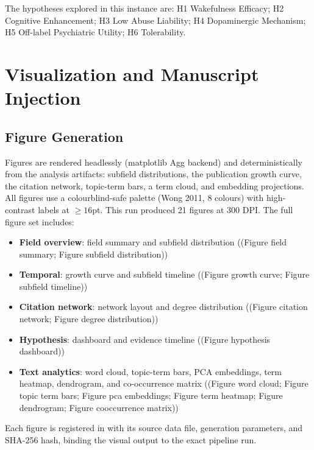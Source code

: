 \documentclass[
  english,
]{article}
\providecommand{\tightlist}{%
  \setlength{\itemsep}{0pt}\setlength{\parskip}{0pt}}
\begin{document}
The hypotheses explored in this instance are: H1 Wakefulness Efficacy;
H2 Cognitive Enhancement; H3 Low Abuse Liability; H4 Dopaminergic
Mechanism; H5 Off-label Psychiatric Utility; H6 Tolerability.

\newpage

\section{Visualization and Manuscript
Injection}\label{visualization-and-manuscript-injection}

\subsection{Figure Generation}\label{figure-generation}

Figures are rendered headlessly (matplotlib Agg backend) and
deterministically from the analysis artifacts: subfield distributions,
the publication growth curve, the citation network, topic-term bars, a
term cloud, and embedding projections. All figures use a
colourblind-safe palette (Wong 2011, 8 colours) with high-contrast
labels at \(\geq 16\)pt. This run produced 21 figures at 300 DPI. The
full figure set includes:

\begin{itemize}
\tightlist
\item
  \textbf{Field overview}: field summary and subfield distribution
  ((Figure field summary; Figure subfield distribution))
\item
  \textbf{Temporal}: growth curve and subfield timeline ((Figure growth
  curve; Figure subfield timeline))
\item
  \textbf{Citation network}: network layout and degree distribution
  ((Figure citation network; Figure degree distribution))
\item
  \textbf{Hypothesis}: dashboard and evidence timeline ((Figure
  hypothesis dashboard))
\item
  \textbf{Text analytics}: word cloud, topic-term bars, PCA embeddings,
  term heatmap, dendrogram, and co-occurrence matrix ((Figure word
  cloud; Figure topic term bars; Figure pca embeddings; Figure term
  heatmap; Figure dendrogram; Figure cooccurrence matrix))
\end{itemize}

Each figure is registered in  with its
source data file, generation parameters, and SHA-256 hash, binding the
visual output to the exact pipeline run.
\end{document}
